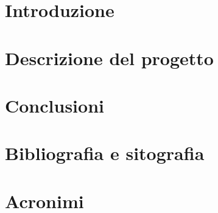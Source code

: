 \thispagestyle{empty} %
\cleardoublepage


\thispagestyle{empty}

\clearpage{\pagestyle{plain}\cleardoublepage}
\tableofcontents


\clearpage{\pagestyle{plain}\cleardoublepage} %

%


\clearpage{\pagestyle{plain}\cleardoublepage}
\chapter{Introduzione}


\clearpage{\pagestyle{plain}\cleardoublepage}
\chapter{Descrizione del progetto}
\label{cha:descrizione}


\clearpage{\pagestyle{plain}\cleardoublepage}
\chapter{Conclusioni}
\label{cha:conclusioni}


\clearpage{\pagestyle{plain}\cleardoublepage}
\chapter{Bibliografia e sitografia}
\label{cha:bibliografia}


\clearpage{\pagestyle{plain}\cleardoublepage}
\chapter{Acronimi}
\label{cha:acronimi}



